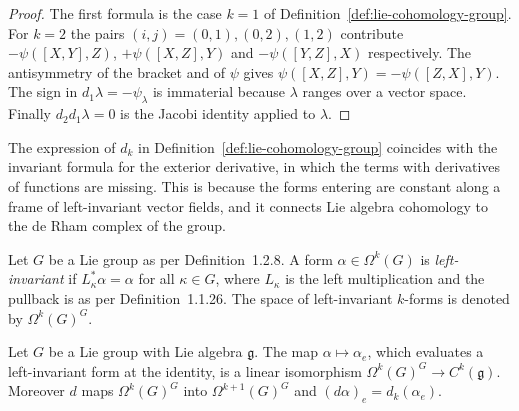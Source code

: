 \begin{proof}
	The first formula is the case $k=1$ of Definition~\ref{def:lie-cohomology-group}. For $k=2$ the pairs $(i,j)=(0,1),(0,2),(1,2)$ contribute $-\psi([X,Y],Z)$, $+\psi([X,Z],Y)$ and $-\psi([Y,Z],X)$ respectively. The antisymmetry of the bracket and of $\psi$ gives $\psi([X,Z],Y)=-\psi([Z,X],Y)$. The sign in $d_1\lambda=-\psi_\lambda$ is immaterial because $\lambda$ ranges over a vector space. Finally $d_2d_1\lambda=0$ is the Jacobi identity applied to $\lambda$.
\end{proof}

The expression of $d_k$ in Definition~\ref{def:lie-cohomology-group} coincides with the invariant formula for the exterior derivative, in which the terms with derivatives of functions are missing. This is because the forms entering are constant along a frame of left-invariant vector fields, and it connects Lie algebra cohomology to the de Rham complex of the group.

\begin{definition}\label{def:left-invariant-form}
	Let $G$ be a Lie group as per Definition~1.2.8. A form $\alpha\in\Omega^k(G)$ is \emph{left-invariant} if $L_\kappa^*\alpha=\alpha$ for all $\kappa\in G$, where $L_\kappa$ is the left multiplication and the pullback is as per Definition~1.1.26. The space of left-invariant $k$-forms is denoted by $\Omega^k(G)^G$.
\end{definition}

\begin{proposition}\label{prop:invariant-forms}
	Let $G$ be a Lie group with Lie algebra $\mathfrak{g}$. The map $\alpha\mapsto\alpha_e$, which evaluates a left-invariant form at the identity, is a linear isomorphism $\Omega^k(G)^G\to C^k(\mathfrak{g})$. Moreover $d$ maps $\Omega^k(G)^G$ into $\Omega^{k+1}(G)^G$ and $(d\alpha)_e=d_k(\alpha_e)$.
\end{proposition}

